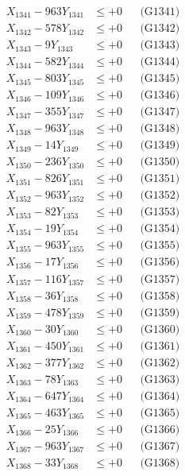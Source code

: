 \documentclass[a4paper,10pt]{article}
\begin{document}
{\begin{align}
\allowbreak
X_{1341} - 963Y_{1341} &\leq +0 && \text{(G1341)} \\
X_{1342} - 578Y_{1342} &\leq +0 && \text{(G1342)} \\
X_{1343} - 9Y_{1343} &\leq +0 && \text{(G1343)} \\
X_{1344} - 582Y_{1344} &\leq +0 && \text{(G1344)} \\
X_{1345} - 803Y_{1345} &\leq +0 && \text{(G1345)} \\
X_{1346} - 109Y_{1346} &\leq +0 && \text{(G1346)} \\
X_{1347} - 355Y_{1347} &\leq +0 && \text{(G1347)} \\
X_{1348} - 963Y_{1348} &\leq +0 && \text{(G1348)} \\
X_{1349} - 14Y_{1349} &\leq +0 && \text{(G1349)} \\
X_{1350} - 236Y_{1350} &\leq +0 && \text{(G1350)} \\
\allowbreak
X_{1351} - 826Y_{1351} &\leq +0 && \text{(G1351)} \\
X_{1352} - 963Y_{1352} &\leq +0 && \text{(G1352)} \\
X_{1353} - 82Y_{1353} &\leq +0 && \text{(G1353)} \\
X_{1354} - 19Y_{1354} &\leq +0 && \text{(G1354)} \\
X_{1355} - 963Y_{1355} &\leq +0 && \text{(G1355)} \\
X_{1356} - 17Y_{1356} &\leq +0 && \text{(G1356)} \\
X_{1357} - 116Y_{1357} &\leq +0 && \text{(G1357)} \\
X_{1358} - 36Y_{1358} &\leq +0 && \text{(G1358)} \\
X_{1359} - 478Y_{1359} &\leq +0 && \text{(G1359)} \\
X_{1360} - 30Y_{1360} &\leq +0 && \text{(G1360)} \\
\allowbreak
X_{1361} - 450Y_{1361} &\leq +0 && \text{(G1361)} \\
X_{1362} - 377Y_{1362} &\leq +0 && \text{(G1362)} \\
X_{1363} - 78Y_{1363} &\leq +0 && \text{(G1363)} \\
X_{1364} - 647Y_{1364} &\leq +0 && \text{(G1364)} \\
X_{1365} - 463Y_{1365} &\leq +0 && \text{(G1365)} \\
X_{1366} - 25Y_{1366} &\leq +0 && \text{(G1366)} \\
X_{1367} - 963Y_{1367} &\leq +0 && \text{(G1367)} \\
X_{1368} - 33Y_{1368} &\leq +0 && \text{(G1368)} \\

\end{align}}
\end{document}
